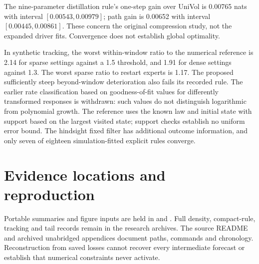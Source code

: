 The nine-parameter distillation rule's one-step gain over UniVol is 0.00765 nats with interval $[0.00543,0.00979]$; path gain is 0.00652 with interval $[0.00445,0.00861]$. These concern the original compression study, not the expanded driver fits. Convergence does not establish global optimality.

In synthetic tracking, the worst within-window ratio to the numerical reference is 2.14 for sparse settings against a 1.5 threshold, and 1.91 for dense settings against 1.3. The worst sparse ratio to restart experts is 1.17. The proposed sufficiently steep beyond-window deterioration also fails its recorded rule. The earlier rate classification based on goodness-of-fit values for differently transformed responses is withdrawn: such values do not distinguish logarithmic from polynomial growth. The reference uses the known law and initial state with support based on the largest visited state; support checks establish no uniform error bound. The hindsight fixed filter has additional outcome information, and only seven of eighteen simulation-fitted explicit rules converge.
\FloatBarrier

\section{Evidence locations and reproduction}
\label{sec:evidence-locations}

Portable summaries and figure inputs are held in  and . Full density, compact-rule, tracking and tail records remain in the research archives. The source README and archived unabridged appendices document paths, commands and chronology. Reconstruction from saved losses cannot recover every intermediate forecast or establish that numerical constraints never activate.




